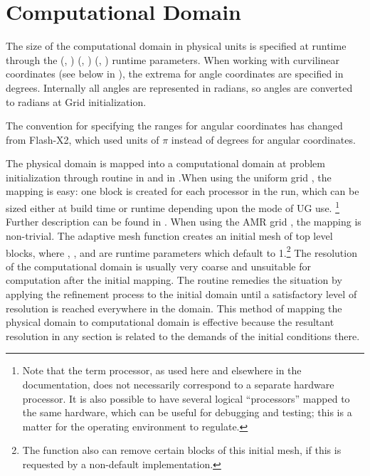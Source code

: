 \section{Computational Domain}
\label{Sec:computational domain}
The size of the computational domain%
in
physical units is specified at runtime through the
(, )%
(, )%
(, )%
runtime parameters.
When working with curvilinear coordinates (see
below in ), the extrema for angle
coordinates%
are specified in
degrees. Internally all angles are represented in radians, so angles
are converted to radians at \unit{Grid} initialization. 
\begin{flashtip}
The convention for specifying the ranges for angular coordinates
has changed from Flash-X2, which used units of $\pi$ instead of degrees
for angular coordinates.
\end{flashtip}

The physical domain is mapped into a computational domain at problem
initialization through routine  in
\Paramesh and  in .When
using the uniform grid , the mapping is easy: one block is
created for each 
processor in the run, which can be sized either at build time or
runtime depending upon the mode of UG use. \footnote{Note that the
term processor, as used here and elsewhere in the 
documentation, does not necessarily correspond to a separate hardware
processor. It is also possible to have several logical ``processors''
mapped to the same hardware, which can be useful for debugging and
testing; this is a matter for the operating environment to regulate.} 
Further description can be found in .
When using the AMR grid \Paramesh, the mapping is non-trivial.
The adaptive mesh  function creates an
initial mesh of  top level blocks,
where , , and 
are runtime parameters which default to 1.\footnote{The
 function also can remove certain blocks of
this initial mesh, if this is requested by a non-default
 implementation.}
The resolution of the computational domain is usually very coarse and
unsuitable for computation after the initial mapping. The
 routine remedies the situation by applying the
refinement process to the initial domain until a satisfactory level of
resolution is reached everywhere in the domain. This method of mapping
the physical domain to computational domain is effective because the
resultant resolution in any section is related to the demands of the
initial conditions there. 

